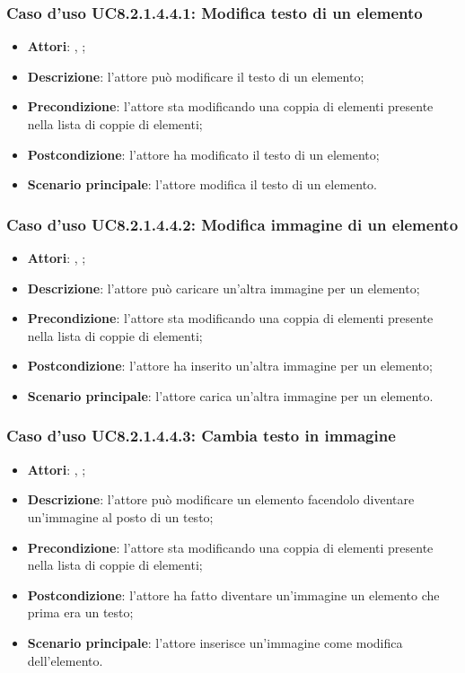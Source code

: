 		\subsubsection{Caso d'uso UC8.2.1.4.4.1: Modifica testo di un elemento}
		\label{UC8.2.1.4.4.1}
		\begin{itemize}
			\item \textbf{Attori}: \uau, \uaupro;
			\item \textbf{Descrizione}: l'attore può modificare il testo di un elemento;
			\item \textbf{Precondizione}: l'attore sta modificando una coppia di elementi presente nella lista di coppie di elementi; 
			\item \textbf{Postcondizione}: l'attore ha modificato il testo di un elemento;
			\item \textbf{Scenario principale}: l'attore modifica il testo di un elemento.  
		\end{itemize}
		
		\subsubsection{Caso d'uso UC8.2.1.4.4.2: Modifica immagine di un elemento}
		\label{UC8.2.1.4.4.2}
		\begin{itemize}
			\item \textbf{Attori}: \uau, \uaupro;
			\item \textbf{Descrizione}: l'attore può caricare un'altra immagine per un elemento;
			\item \textbf{Precondizione}: l'attore sta modificando una coppia di elementi presente nella lista di coppie di elementi; 
			\item \textbf{Postcondizione}: l'attore ha inserito un'altra immagine per un elemento;
			\item \textbf{Scenario principale}: l'attore carica un'altra immagine per un elemento.
		\end{itemize}
		
		\subsubsection{Caso d'uso UC8.2.1.4.4.3: Cambia testo in immagine}
		\label{UC8.2.1.4.4.3}
		\begin{itemize}
			\item \textbf{Attori}: \uau, \uaupro;
			\item \textbf{Descrizione}: l'attore può modificare un elemento facendolo diventare un'immagine al posto di un testo;
			\item \textbf{Precondizione}: l'attore sta modificando una coppia di elementi presente nella lista di coppie di elementi; 
			\item \textbf{Postcondizione}: l'attore ha fatto diventare un'immagine un elemento che prima era un testo;
			\item \textbf{Scenario principale}: l'attore inserisce un'immagine come modifica dell'elemento.  
		\end{itemize}
		
